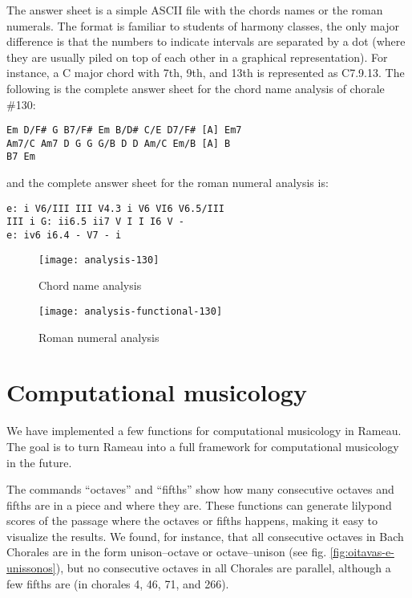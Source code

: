 The answer sheet is a simple ASCII file with the chords names or the
roman numerals. The format is familiar to students of harmony classes,
the only major difference is that the numbers to indicate intervals
are separated by a dot (where they are usually piled on top of each
other in a graphical representation). For instance, a C major chord
with 7th, 9th, and 13th is represented as C7.9.13. The following is
the complete answer sheet for the chord name analysis of chorale
\#130:

\begin{verbatim}
Em D/F# G B7/F# Em B/D# C/E D7/F# [A] Em7
Am7/C Am7 D G G G/B D D Am/C Em/B [A] B 
B7 Em
\end{verbatim}

and the complete answer sheet for the roman numeral analysis is:

\begin{verbatim}
e: i V6/III III V4.3 i V6 VI6 V6.5/III
III i G: ii6.5 ii7 V I I I6 V -
e: iv6 i6.4 - V7 - i
\end{verbatim}

\begin{figure}
  \centering
  \texttt{[image: analysis-130]}
  \caption{Chord name analysis}
  \label{fig:chord-name-analysis}
\end{figure}
\begin{figure}
  \centering
  \texttt{[image: analysis-functional-130]}  
  \caption{Roman numeral analysis}
  \label{fig:roman-analysis}
\end{figure}


\section{Computational musicology}
\label{sec:comp-music}

We have implemented a few functions for computational musicology in
Rameau. The goal is to turn Rameau into a full framework for
computational musicology in the future.

The commands ``octaves'' and ``fifths'' show how many consecutive
octaves and fifths are in a piece and where they are. These functions
can generate lilypond scores of the passage where the octaves or
fifths happens, making it easy to visualize the results. We found, for
instance, that all consecutive octaves in Bach Chorales are in the
form unison--octave or octave--unison (see fig.
\ref{fig:oitavas-e-unissonos}), but no consecutive octaves in all
Chorales are parallel, although a few fifths are (in chorales 4, 46,
71, and 266).

